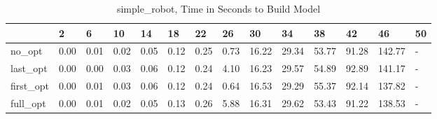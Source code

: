 \begin{table}
\caption{simple_robot, Time in Seconds to Build Model}
\label{simple_robot_model_time}
\begin{tabular}{llllllllllllll}
\toprule
 & 2 & 6 & 10 & 14 & 18 & 22 & 26 & 30 & 34 & 38 & 42 & 46 & 50 \\
\midrule
no_opt & 0.00 & 0.01 & 0.02 & 0.05 & 0.12 & 0.25 & 0.73 & 16.22 & 29.34 & 53.77 & 91.28 & 142.77 & - \\
last_opt & 0.00 & 0.00 & 0.03 & 0.06 & 0.12 & 0.24 & 4.10 & 16.23 & 29.57 & 54.89 & 92.89 & 141.17 & - \\
first_opt & 0.00 & 0.01 & 0.03 & 0.06 & 0.12 & 0.24 & 0.64 & 16.53 & 29.29 & 55.37 & 92.14 & 137.82 & - \\
full_opt & 0.00 & 0.01 & 0.02 & 0.05 & 0.13 & 0.26 & 5.88 & 16.31 & 29.62 & 53.43 & 91.22 & 138.53 & - \\
\bottomrule
\end{tabular}
\end{table}
